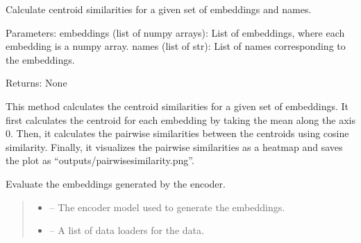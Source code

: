 \documentclass[letterpaper,10pt,english]{sphinxhowto}
\begin{document}
\begin{fulllineitems}

\begin{fulllineitems}
\label{\detokenize{top:id1}}
\pysigstartsignatures
{}
\pysigstopsignatures
\sphinxAtStartPar
Calculate centroid similarities for a given set of embeddings and names.

\sphinxAtStartPar
Parameters:
embeddings (list of numpy arrays): List of embeddings, where each embedding is a numpy array.
names (list of str): List of names corresponding to the embeddings.

\sphinxAtStartPar
Returns:
None

\sphinxAtStartPar
This method calculates the centroid similarities for a given set of embeddings. It first calculates the centroid
for each embedding by taking the mean along the axis 0. Then, it calculates the pairwise similarities between
the centroids using cosine similarity. Finally, it visualizes the pairwise similarities as a heatmap and saves
the plot as “outputs/pairwise\sphinxhyphen{}similarity.png”.

\end{fulllineitems}


\begin{fulllineitems}
\label{\detokenize{top:id2}}
\pysigstartsignatures
{}
\pysigstopsignatures
\sphinxAtStartPar
Evaluate the embeddings generated by the encoder.
\begin{quote}\begin{description}
\begin{itemize}
\item {} 
\sphinxAtStartPar
{} – The encoder model used to generate the embeddings.

\item {} 
\sphinxAtStartPar
{} – A list of data loaders for the data.


\end{itemize}
\end{description}
\end{quote}
\end{fulllineitems}
\end{fulllineitems}
\end{document}
